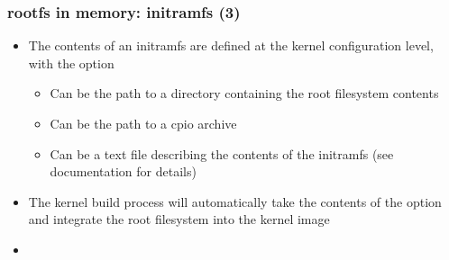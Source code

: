 \begin{frame}
  \frametitle{rootfs in memory: initramfs (3)}
  \begin{itemize}
  \item The contents of an initramfs are defined at the kernel
    configuration level, with the 
    option
    \begin{itemize}
    \item Can be the path to a directory containing the root
      filesystem contents
    \item Can be the path to a cpio archive
    \item Can be a text file describing the contents of the initramfs
      (see documentation for details)
    \end{itemize}
  \item The kernel build process will automatically take the contents
    of the  option and integrate the
    root filesystem into the kernel image
  \item {}\\
  \end{itemize}
\end{frame}
